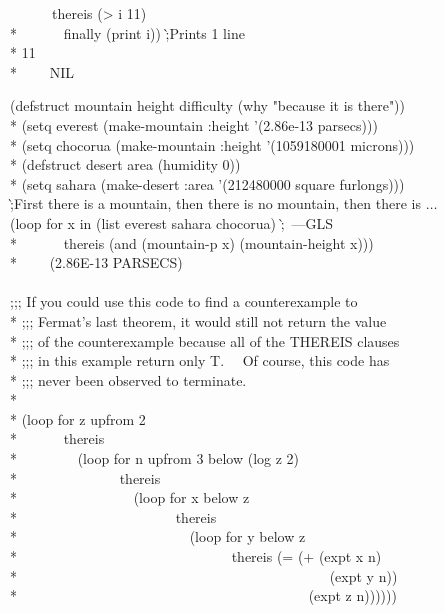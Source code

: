 \begin{defloop}
\begin{lisp}
~~~~~~thereis (> i 11) \\*
~~~~~~finally (print i)) \`;{\rm Prints 1 line}\\*
11 \\*
~~~\EV~NIL
\end{lisp}
\goodbreak
\begin{lisp}
(defstruct mountain height difficulty (why "because it is there")) \\*
(setq everest (make-mountain :height '(2.86e-13 parsecs))) \\*
(setq chocorua (make-mountain :height '(1059180001 microns))) \\*
(defstruct desert area (humidity 0)) \\*
(setq sahara (make-desert :area '(212480000 square furlongs))) \\
\`;{\rm First there is a mountain, then there is no mountain, then there is $\ldots$} \\
(loop for x in (list everest sahara chocorua) \`;~{\rm ---GLS} \\*
~~~~~~thereis (and (mountain-p x) (mountain-height x))) \\*
~~~\EV~(2.86E-13 PARSECS) \\
 \\
;;; If you could use this code to find a counterexample to \\*
;;; Fermat's last theorem, it would still not return the value \\*
;;; of the counterexample because all of the THEREIS clauses \\*
;;; in this example return only T.~~ Of course, this code has \\*
;;; never been observed to terminate. \\*
 \\*
(loop for z upfrom 2 \\*
~~~~~~thereis \\*
~~~~~~~~(loop for n upfrom 3 below (log z 2) \\*
~~~~~~~~~~~~~~thereis \\*
~~~~~~~~~~~~~~~~(loop for x below z \\*
~~~~~~~~~~~~~~~~~~~~~~thereis \\*
~~~~~~~~~~~~~~~~~~~~~~~~(loop for y below z \\*
~~~~~~~~~~~~~~~~~~~~~~~~~~~~~~thereis (= (+ (expt x n) \\*
~~~~~~~~~~~~~~~~~~~~~~~~~~~~~~~~~~~~~~~~~~~~(expt y n)) \\*
~~~~~~~~~~~~~~~~~~~~~~~~~~~~~~~~~~~~~~~~~(expt z n))))))
\end{lisp}
\end{defloop}

